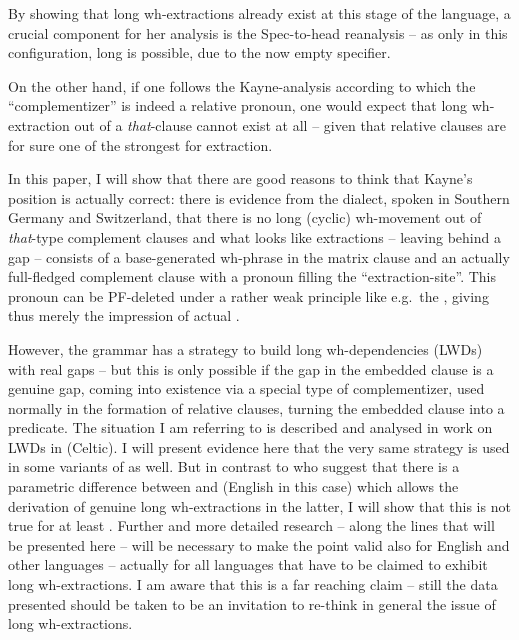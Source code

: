 \documentclass[output=paper]{langsci/langscibook}
\begin{document}
By showing that long wh-extractions already exist at this stage of the
language, a crucial component for her analysis is the Spec-to-head reanalysis --
as only in this configuration, long  is possible, due to the
now empty specifier.

On the other hand, if one follows the Kayne-analysis according to which the
\enquote{complementizer} is indeed a relative pronoun, one would expect that long
wh-extraction out of a \emph{that}-clause cannot exist at all -- given that
relative clauses are for sure one of the strongest  for extraction.

In this paper, I will show that there are good reasons to think that Kayne’s
position is actually correct: there is evidence from the  dialect,
spoken in Southern Germany and Switzerland, that there is no long (cyclic)
wh-movement out of \emph{that}-type complement clauses and what looks like
extractions -- leaving behind a gap -- consists of a base-generated wh-phrase in
the matrix clause and an actually full-fledged complement clause with a
pronoun filling the \enquote{extraction-site}. This pronoun can be PF-deleted under a
rather weak principle like e.g.\ the 
\citep{Chomsky1981}, giving thus merely the impression of actual .

However, the grammar has a strategy to build long wh-dependencies
(\glspl{LWD}) with real gaps -- but this is only possible if the
gap in the embedded clause is a genuine gap, coming into existence via a
special type of complementizer, used normally in the formation of relative
clauses, turning the embedded clause into a predicate. The situation I am
referring to is described and analysed in  work on
\glspl{LWD} in  (Celtic). I will present evidence here that the very same
strategy is used in some variants of  as well. But in contrast to
\citet{AdgRam2005} who suggest that there is a parametric difference
between  and  (English in this case) which allows the derivation
of genuine long wh-extractions in the latter, I will show that this is not true
for at least . Further and more detailed research -- along the lines
that will be presented here -- will be necessary to make the point valid also
for English and other  languages -- actually for all languages that have
to be claimed to exhibit long wh-extractions. I am aware that this is a far
reaching claim -- still the data presented should be taken to be an invitation
to re-think in general the issue of long wh-extractions.
\end{document}
